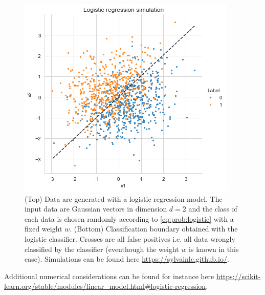 \begin{figure}
\begin{center}
\includegraphics[width = .8\linewidth]{./Illustrations/logistic_decision.png}
\end{center}
\caption{(Top) Data are generated with a logistic regression model. The input data are Gaussian vectors in dimension $d = 2$ and the class of each data is chosen randomly according to \eqref{eq:prob:logistic} with a fixed weight $w$. (Bottom)  Classification boundary obtained with the logistic classifier. Crosses are all false positives i.e. all data wrongly classified by the classifier (eventhough the weight $w$ is known in this case). Simulations can be found here \url{https://sylvainlc.github.io/}.}
\end{figure}


Additional numerical considerations can be found for instance here \url{https://scikit-learn.org/stable/modules/linear\_model.html#logistic-regression}.


